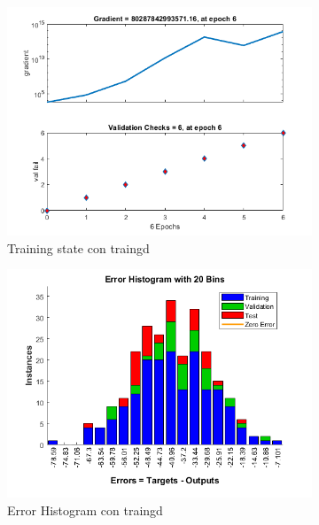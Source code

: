 \documentclass[a4paper, 12pt]{article}
\begin{document}
\begin{figure}[htp!]
\begin{subfigure}{0.49\textwidth}
                        \includegraphics[width=\textwidth]{figures/parte1/Ej3/Ej3_training_state_traingd.png}
                        \caption{Training state con traingd}
                    \end{subfigure}
                    \begin{subfigure}{0.49\textwidth}
                        \includegraphics[width=\textwidth]{figures/parte1/Ej3/Ej3_error_traingd.png}
                        \caption{Error Histogram con traingd}
                    \end{subfigure}
                    \begin{subfigure}{0.49\textwidth}

\end{subfigure}
\end{figure}
\end{document}
